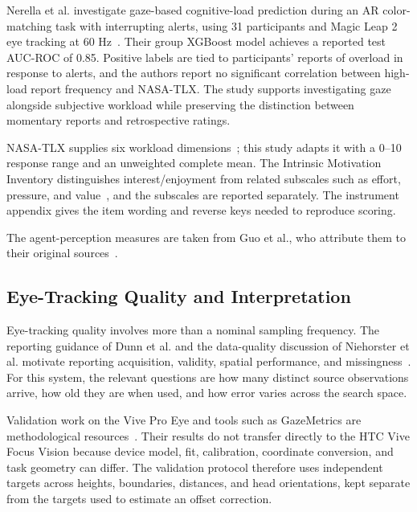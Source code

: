 Nerella et al. investigate gaze-based cognitive-load prediction during an AR color-matching task with interrupting alerts, using 31 participants and Magic Leap 2 eye tracking at 60 Hz~\cite{nerella2026gaze}. Their group XGBoost model achieves a reported test AUC-ROC of 0.85. Positive labels are tied to participants' reports of overload in response to alerts, and the authors report no significant correlation between high-load report frequency and NASA-TLX. The study supports investigating gaze alongside subjective workload while preserving the distinction between momentary reports and retrospective ratings.

NASA-TLX supplies six workload dimensions~\cite{hart1988nasatlx}; this study adapts it with a 0--10 response range and an unweighted complete mean. The Intrinsic Motivation Inventory distinguishes interest/enjoyment from related subscales such as effort, pressure, and value~\cite{ryan1982control,mcauley1989imi,csdtIMI}, and the subscales are reported separately. The instrument appendix gives the item wording and reverse keys needed to reproduce scoring.

The agent-perception measures are taken from Guo et al., who attribute them to their original sources~\cite{guo2024doppelganger,biocca2001networked,moussawi2019perception}.

\subsection{Eye-Tracking Quality and Interpretation}
Eye-tracking quality involves more than a nominal sampling frequency. The reporting guidance of Dunn et al. and the data-quality discussion of Niehorster et al. motivate reporting acquisition, validity, spatial performance, and missingness~\cite{dunn2024reporting,niehorster2026dataquality}. For this system, the relevant questions are how many distinct source observations arrive, how old they are when used, and how error varies across the search space.

Validation work on the Vive Pro Eye and tools such as GazeMetrics are methodological resources~\cite{schuetz2022vive,sipatchin2021usability,adhanom2020gazemetrics}. Their results do not transfer directly to the HTC Vive Focus Vision because device model, fit, calibration, coordinate conversion, and task geometry can differ. The validation protocol therefore uses independent targets across heights, boundaries, distances, and head orientations, kept separate from the targets used to estimate an offset correction.

